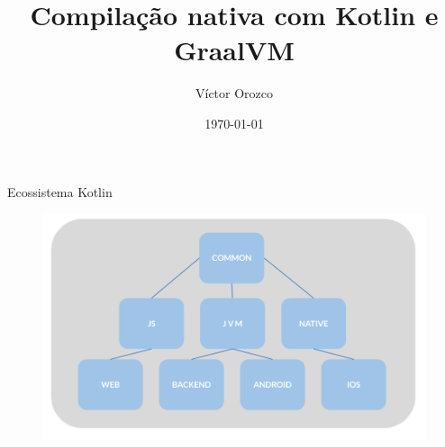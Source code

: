 \documentclass[aspectratio=169]{beamer}
\title{Compilação nativa com Kotlin e GraalVM}
\author{Víctor Orozco}
\institute{Nabenik}
\date{\today}
\begin{document}
{
    \frame{\titlepage}
}


\begin{frame}{Ecossistema Kotlin}
\begin{figure}
	\centering
	\includegraphics[width=0.8\linewidth]{Images/KotlinNative.png}
	\label{fig:kotlin}
\end{figure}
\end{frame}
\end{document}
